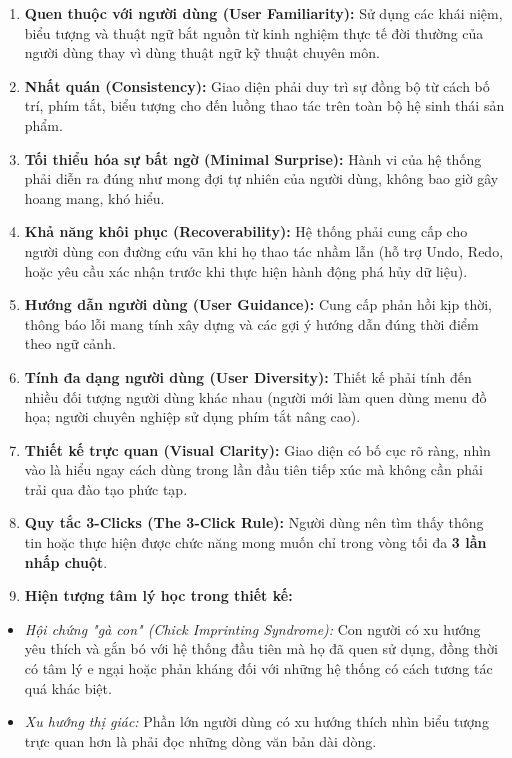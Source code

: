 \documentclass[11pt,a4paper,oneside]{report}
\begin{document}
\begin{enumerate}[leftmargin=1.5em]
\item \textbf{Quen thuộc với người dùng (User Familiarity):} Sử dụng các khái niệm, biểu tượng và thuật ngữ bắt nguồn từ kinh nghiệm thực tế đời thường của người dùng thay vì dùng thuật ngữ kỹ thuật chuyên môn.
\item \textbf{Nhất quán (Consistency):} Giao diện phải duy trì sự đồng bộ từ cách bố trí, phím tắt, biểu tượng cho đến luồng thao tác trên toàn bộ hệ sinh thái sản phẩm.
\item \textbf{Tối thiểu hóa sự bất ngờ (Minimal Surprise):} Hành vi của hệ thống phải diễn ra đúng như mong đợi tự nhiên của người dùng, không bao giờ gây hoang mang, khó hiểu.
\item \textbf{Khả năng khôi phục (Recoverability):} Hệ thống phải cung cấp cho người dùng con đường cứu vãn khi họ thao tác nhầm lẫn (hỗ trợ Undo, Redo, hoặc yêu cầu xác nhận trước khi thực hiện hành động phá hủy dữ liệu).
\item \textbf{Hướng dẫn người dùng (User Guidance):} Cung cấp phản hồi kịp thời, thông báo lỗi mang tính xây dựng và các gợi ý hướng dẫn đúng thời điểm theo ngữ cảnh.
\item \textbf{Tính đa dạng người dùng (User Diversity):} Thiết kế phải tính đến nhiều đối tượng người dùng khác nhau (người mới làm quen dùng menu đồ họa; người chuyên nghiệp sử dụng phím tắt nâng cao).
\item \textbf{Thiết kế trực quan (Visual Clarity):} Giao diện có bố cục rõ ràng, nhìn vào là hiểu ngay cách dùng trong lần đầu tiên tiếp xúc mà không cần phải trải qua đào tạo phức tạp.
\item \textbf{Quy tắc 3-Clicks (The 3-Click Rule):} Người dùng nên tìm thấy thông tin hoặc thực hiện được chức năng mong muốn chỉ trong vòng tối đa \textbf{3 lần nhấp chuột}.
\item \textbf{Hiện tượng tâm lý học trong thiết kế:}
\end{enumerate}
\begin{itemize}[leftmargin=1.5em]
\item \textit{Hội chứng "gà con" (Chick Imprinting Syndrome):} Con người có xu hướng yêu thích và gắn bó với hệ thống đầu tiên mà họ đã quen sử dụng, đồng thời có tâm lý e ngại hoặc phản kháng đối với những hệ thống có cách tương tác quá khác biệt.
\item \textit{Xu hướng thị giác:} Phần lớn người dùng có xu hướng thích nhìn biểu tượng trực quan hơn là phải đọc những dòng văn bản dài dòng.
\end{itemize}
\end{document}
